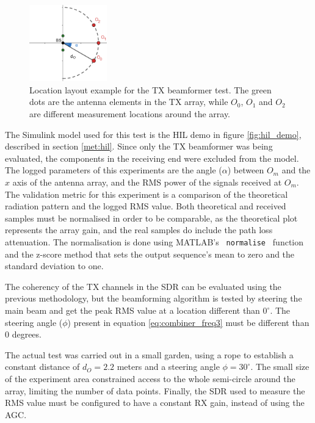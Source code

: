 \documentclass[12pt,a4paper]{report}
\begin{document}
\begin{figure}[h]
    \centering
    \includegraphics[width = 0.3\textwidth]{Figures/test_bf_tx.png}
    \caption[Example layout for the TX beamformer test.]{Location layout example for the TX beamformer test. The green dots are the antenna elements in the TX array, while $O_0$, $O_1$ and $O_2$ are different measurement locations around the array.}
    \label{fig:test:bf:tx}
\end{figure}

The Simulink model used for this test is the HIL demo in figure \ref{fig:hil_demo}, described in section \ref{met:hil}. Since only the TX beamformer was being evaluated, the components in the receiving end were excluded from the model.
The logged parameters of this experiments are the angle ($\alpha$) between $O_m$ and the $x$ axis of the antenna array, and the RMS power of the signals received at $O_m$. The validation metric for this experiment is a comparison of the theoretical radiation pattern and the logged RMS value. Both theoretical and received samples must be normalised in order to be comparable, as the theoretical plot represents the array gain, and the real samples do include the path loss attenuation. The normalisation is done using MATLAB's \verb| normalise | function and the z-score method that sets the output sequence's mean to zero and the standard deviation to one.

The coherency of the TX channels in the SDR can be evaluated using the previous methodology, but the beamforming algorithm is tested by steering the main beam and get the peak RMS value at a location different than $0^\circ$. The steering angle ($\phi$) present in equation \ref{eq:combiner_freq3} must be different than 0 degrees.

The actual test was carried out in a small garden, using a rope to establish a constant distance of $d_O = 2.2$ meters and a steering angle $\phi = 30^\circ$. The small size of the experiment area constrained access to the whole semi-circle around the array, limiting the number of data points. Finally, the SDR used to measure the RMS value must be configured to have a constant RX gain, instead of using the AGC.
\end{document}
